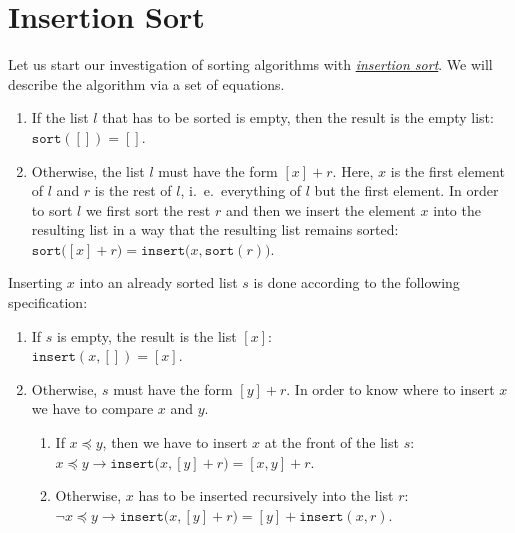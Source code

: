 \section{Insertion Sort}
Let us start our investigation of sorting algorithms with
\href{http://en.wikipedia.org/wiki/Insertion_sort}{\emph{insertion sort}}.  We will describe the
algorithm via a set of equations.
\begin{enumerate}
\item If the list $l$ that has to be sorted is empty, then the result is the empty list: 
      \\[0.2cm]
      \hspace*{1.3cm}
      $\mathtt{sort}([]) = []$.
\item Otherwise, the list $l$ must have the form $[x] + r$. Here, $x$ is the first element of $l$
      and $r$ is the rest of $l$, i.~e.~everything of $l$ but the first element.  In order to sort
      $l$ we first sort the rest $r$ and then we insert the element $x$ into the resulting list in a
      way that the resulting list remains sorted:
      \\[0.2cm]
      \hspace*{1.3cm} $\mathtt{sort}\bigl([x] + r\bigr) = \mathtt{insert}\bigl(x, \mathtt{sort}(r)\bigr)$.
\end{enumerate}
Inserting $x$ into an already sorted list $s$ is done according to the following specification:
\begin{enumerate}
\item If $s$ is empty, the result is the list $[x]$: \\[0.2cm]
      \hspace*{1.3cm}
      $\mathtt{insert}(x,[]) = [x]$.
\item Otherwise, $s$ must have the form $[y] + r$.  In order to know where to insert $x$ we have to
      compare $x$ and $y$.
      \begin{enumerate}
      \item If $x \preceq y$, then we have to insert $x$ at the front of the list $s$: \\[0.2cm]
            \hspace*{1.3cm}
            $x \preceq y \rightarrow \mathtt{insert}\bigl(x, [y] + r\bigr) = [x,y] + r$. 
      \item Otherwise, $x$ has to be inserted recursively into the list $r$: \\[0.2cm]
            \hspace*{1.3cm}
            $\neg x \preceq y \rightarrow \mathtt{insert}\bigl(x, [y] + r\bigr) = [y] + \mathtt{insert}(x,r)$. 
      \end{enumerate}
\end{enumerate}

